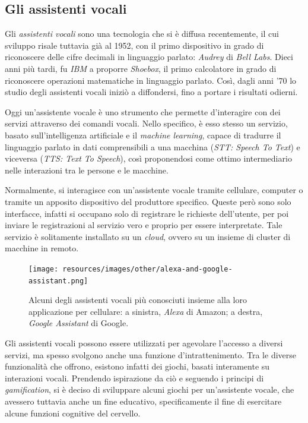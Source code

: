 \subsection{Gli assistenti vocali}
\label{subsec:Sezione1.2.2}

Gli \textit{assistenti vocali} sono una tecnologia che si è diffusa
recentemente, il cui sviluppo risale tuttavia già al 1952, con il primo
dispositivo in grado di riconoscere delle cifre decimali in linguaggio parlato:
\textit{Audrey} di \textit{Bell Labs}. Dieci anni più tardi, fu \textit{IBM} a
proporre \textit{Shoebox}, il primo calcolatore in grado di riconoscere
operazioni matematiche in linguaggio parlato. Così, dagli anni '70 lo studio
degli assistenti vocali iniziò a diffondersi, fino a portare i risultati
odierni. \cite{VOCAL_ASSISTANT}

Oggi un’assistente vocale è uno strumento che permette d'interagire con dei
servizi attraverso dei comandi vocali. Nello specifico, è esso stesso un
servizio, basato sull’intelligenza artificiale e il \textit{machine learning},
capace di tradurre il linguaggio parlato in dati comprensibili a una macchina
(\textit{STT: Speech To Text}) e viceversa (\textit{TTS: Text To Speech}), così
proponendosi come ottimo intermediario nelle interazioni tra le persone e le
macchine.

Normalmente, si interagisce con un’assistente vocale tramite cellulare,
computer o tramite un apposito dispositivo del produttore specifico. Queste
però sono solo interfacce, infatti si occupano solo di registrare le richieste
dell’utente, per poi inviare le registrazioni al servizio vero e proprio per
essere interpretate. Tale servizio è solitamente installato su un
\textit{cloud}, ovvero su un insieme di cluster di macchine in remoto.

\begin{figure}[!ht]
  \centering
  \texttt{[image: resources/images/other/alexa-and-google-assistant.png]}
  \caption{
    Alcuni degli assistenti vocali più conosciuti insieme alla loro
    applicazione per cellulare: a sinistra, \textit{Alexa} di Amazon; a destra,
    \textit{Google Assistant} di Google.
  }
  \label{fig:figure1.2}
\end{figure}

Gli assistenti vocali possono essere utilizzati per agevolare l'accesso a
diversi servizi, ma spesso svolgono anche una funzione d'intrattenimento. Tra
le diverse funzionalità che offrono, esistono infatti dei giochi, basati
interamente su interazioni vocali. Prendendo ispirazione da ciò e seguendo i
principi di \textit{gamification}, si è deciso di sviluppare alcuni giochi per
un'assistente vocale, che avessero tuttavia anche un fine educativo,
specificamente il fine di esercitare alcune funzioni cognitive del cervello.

